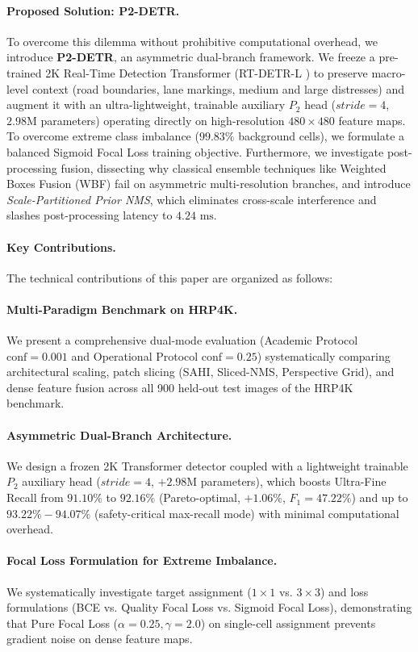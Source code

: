 \documentclass[runningheads]{llncs}
\begin{document}
\paragraph{Proposed Solution: P2-DETR.}
To overcome this dilemma without prohibitive computational overhead, we introduce \textbf{P2-DETR}, an asymmetric dual-branch framework. We freeze a pre-trained 2K Real-Time Detection Transformer (RT-DETR-L \cite{lv2023detrs}) to preserve macro-level context (road boundaries, lane markings, medium and large distresses) and augment it with an ultra-lightweight, trainable auxiliary $P_2$ head ($stride=4$, $2.98\text{M}$ parameters) operating directly on high-resolution $480 \times 480$ feature maps. To overcome extreme class imbalance ($99.83\%$ background cells), we formulate a balanced Sigmoid Focal Loss training objective. Furthermore, we investigate post-processing fusion, dissecting why classical ensemble techniques like Weighted Boxes Fusion (WBF) \cite{solovyev2021weighted} fail on asymmetric multi-resolution branches, and introduce \textit{Scale-Partitioned Prior NMS}, which eliminates cross-scale interference and slashes post-processing latency to $4.24\text{ ms}$.

\paragraph{Key Contributions.}
The technical contributions of this paper are organized as follows:
\paragraph{Multi-Paradigm Benchmark on HRP4K.} We present a comprehensive dual-mode evaluation (Academic Protocol $\text{conf}=0.001$ and Operational Protocol $\text{conf}=0.25$) systematically comparing architectural scaling, patch slicing (SAHI, Sliced-NMS, Perspective Grid), and dense feature fusion across all 900 held-out test images of the HRP4K benchmark.
\paragraph{Asymmetric Dual-Branch Architecture.} We design a frozen 2K Transformer detector coupled with a lightweight trainable $P_2$ auxiliary head ($stride=4$, $+2.98\text{M}$ parameters), which boosts Ultra-Fine Recall from $91.10\%$ to $92.16\%$ (Pareto-optimal, $+1.06\%$, $F_1=47.22\%$) and up to $93.22\% - 94.07\%$ (safety-critical max-recall mode) with minimal computational overhead.
\paragraph{Focal Loss Formulation for Extreme Imbalance.} We systematically investigate target assignment ($1\times 1$ vs. $3\times 3$) and loss formulations (BCE vs. Quality Focal Loss vs. Sigmoid Focal Loss), demonstrating that Pure Focal Loss ($\alpha=0.25, \gamma=2.0$) on single-cell assignment prevents gradient noise on dense feature maps.
\end{document}
